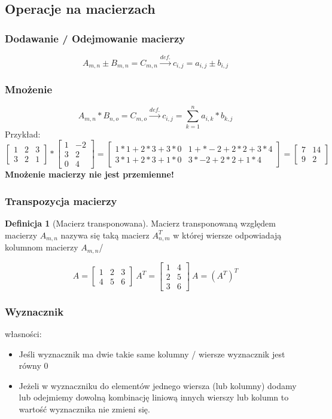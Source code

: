 \documentclass[a4paper,12pt]{article}
\theoremstyle{definition}%
\theoremstyle{definition}
\newtheorem{definition}{Definicja}%
\theoremstyle{problem}
\begin{document}
\subsection{Operacje na macierzach}
\subsubsection{Dodawanie / Odejmowanie macierzy}
$$A_{m,n} \pm B_{m,n} = C_{m,n} \overset{def.}{\longrightarrow} c_{i,j}=a_{i,j}\pm b_{i,j}$$
\subsubsection{Mnożenie}
$$A_{m,n} * B_{n,o} = C_{m,o} \overset{def.}{\longrightarrow} c_{i,j}= \sum_{k=1}^n a_{i,k} * b_{k,j}$$
Przykład:
$$\begin{bmatrix}
1 & 2 & 3\\ 
3 & 2 & 1
\end{bmatrix} * \begin{bmatrix}
1 & -2\\ 
3 & 2\\ 
0 & 4
\end{bmatrix}=\begin{bmatrix}
1*1+2*3+3*0 & 1+*-2+2*2+3*4\\ 
3*1+2*3+1*0 & 3*-2+2*2+1*4
\end{bmatrix} = \begin{bmatrix}
7&14\\
9&2
\end{bmatrix}$$
\textbf{Mnożenie macierzy nie jest przemienne!}
\subsubsection{Transpozycja macierzy}
\begin{definition}[Macierz transponowana]
Macierz transponowaną względem macierzy $A_{m,n}$ nazywa się taką macierz $A_{n,m}^T$ w której wiersze odpowiadają kolumnom macierzy $A_{m,n}$/
\end{definition}
$$A=\begin{bmatrix}
1 & 2& 3\\
4& 5 &6
\end{bmatrix}\ A^T=\begin{bmatrix}
1 & 4\\
2 & 5\\
3 & 6
\end{bmatrix}\ A=(A^T)^T$$

\subsubsection{Wyznacznik}
własności:
\begin{itemize}
\item Jeśli wyznacznik ma dwie takie same kolumny / wiersze wyznacznik jest równy 0
\item Jeżeli w wyznaczniku do elementów jednego wiersza (lub kolumny) dodamy lub odejmiemy dowolną kombinację liniową innych wierszy lub kolumn to wartość wyznacznika nie zmieni się.
\end{itemize}
\end{document}
